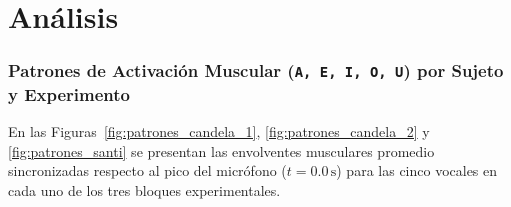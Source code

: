 \documentclass[11pt, a4paper]{article}
\begin{document}
\part{Análisis}
\section{Patrones de Activación Muscular (\texttt{A, E, I, O, U}) por Sujeto y Experimento}

En las Figuras~\ref{fig:patrones_candela_1}, \ref{fig:patrones_candela_2} y \ref{fig:patrones_santi} se presentan las envolventes musculares promedio sincronizadas respecto al pico del micrófono ($t=0.0\,\text{s}$) para las cinco vocales en cada uno de los tres bloques experimentales.
\end{document}
